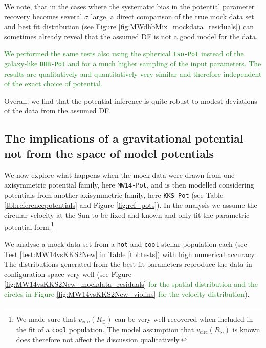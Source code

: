 \documentclass[iop,revtex4,numberedappendix,appendixfloats]{emulateapj}
\newcommand{\NEW}[1]{\textcolor{ForestGreen}{#1}}
\begin{document}
We note, that in the cases where the systematic bias in the potential parameter recovery becomes several $\sigma$ large, a direct comparison of the true mock data set and best fit distribution (see Figure \ref{fig:MWdhbMix_mockdata_residuals}) can sometimes already reveal that the assumed DF is not a good model for the data.

\NEW{We performed the same tests also using the spherical \texttt{Iso-Pot} instead of the galaxy-like \texttt{DHB-Pot} and for a much higher sampling of the input parameters. The results are qualitatively and quantitatively very similar and therefore independent of the exact choice of potential.}

Overall, we find that the potential inference is quite robust to modest deviations of the data from the assumed DF. 

\subsection{The implications of a gravitational potential not from the space of model potentials} \label{sec:results_potential}

We now explore what happens when the mock data were drawn from one axisymmetric potential family, here \texttt{MW14-Pot}, and is then modelled considering potentials from another axisymmetric family, here \texttt{KKS-Pot} (see Table \ref{tbl:referencepotentials} and Figure \ref{fig:ref_pots}). In the analysis we assume the circular velocity at the Sun to be fixed and known and only fit the parametric potential form.\footnote{We made sure that $v_\text{circ}(R_\odot)$ can be very well recovered when included in the fit of a \texttt{cool} population. The model assumption that $v_\text{circ}(R_\odot)$ is known does therefore not affect the discussion qualitatively.}

We analyse a mock data set from a \texttt{hot} and \texttt{cool} stellar population each (see Test \ref{test:MW14vsKKS2New} in Table \ref{tbl:tests}) with high numerical accuracy. The distributions generated from the best fit parameters reproduce the data in configuration space very well (see Figure \ref{fig:MW14vsKKS2New_mockdata_residuals} \NEW{for the spatial distribution and the circles in Figure \ref{fig:MW14vsKKS2New_violins} for the velocity distribution}).
\end{document}
